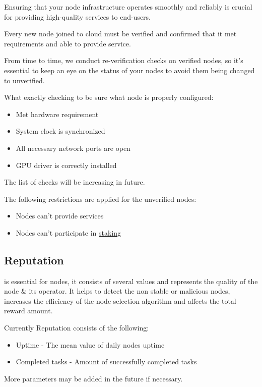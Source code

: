 Ensuring that your node infrastructure operates smoothly and reliably is crucial for providing high-quality services to end-users.

Every new node joined to cloud must be verified and confirmed that it met requirements and able to provide service.

From time to time, we conduct re-verification checks on verified nodes, so it's essential to keep an eye on the status of your nodes to avoid them being changed to unverified.

What exactly checking to be sure what node is properly configured:

\begin{itemize}
    \item Met hardware requirement
    \item System clock is synchronized
    \item All necessary network ports are open
    \item GPU driver is correctly installed
\end{itemize}

The list of checks will be increasing in future.

The following restrictions are applied for the unverified nodes:

\begin{itemize}
    \item Nodes can't provide services
    \item Nodes can't participate in \hyperref[sec:staking]{staking}
\end{itemize}

\subsection{Reputation}
is essential for nodes, it consists of several values and represents the quality of the node & its operator. It helps to detect the non stable or malicious nodes, increases the efficiency of the node selection algorithm and affects the total reward amount. 

Currently Reputation consists of the following:

\begin{itemize}
\item Uptime - The mean value of daily nodes uptime
\item Completed tasks - Amount of successfully completed tasks
\end{itemize}

More parameters may be added in the future if necessary.

